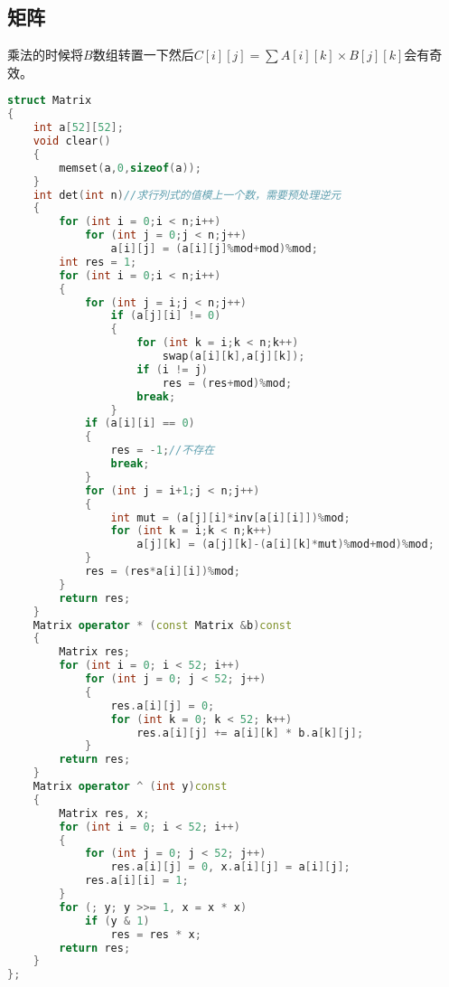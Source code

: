 \subsection{矩阵}
	乘法的时候将$B$数组转置一下然后$C[i][j] = \sum{A[i][k]\times B[j][k]}$会有奇效。
	\begin{lstlisting}[language=c++]
struct Matrix
{
	int a[52][52];
	void clear()
	{
		memset(a,0,sizeof(a));
	}
	int det(int n)//求行列式的值模上一个数，需要预处理逆元
	{
		for (int i = 0;i < n;i++)
			for (int j = 0;j < n;j++)
				a[i][j] = (a[i][j]%mod+mod)%mod;
		int res = 1;
		for (int i = 0;i < n;i++)
		{
			for (int j = i;j < n;j++)
				if (a[j][i] != 0)
				{
					for (int k = i;k < n;k++)
						swap(a[i][k],a[j][k]);
					if (i != j)
						res = (res+mod)%mod;
					break;
				}
			if (a[i][i] == 0)
			{
				res = -1;//不存在
				break;
			}
			for (int j = i+1;j < n;j++)
			{
				int mut = (a[j][i]*inv[a[i][i]])%mod;
				for (int k = i;k < n;k++)
					a[j][k] = (a[j][k]-(a[i][k]*mut)%mod+mod)%mod;
			}
			res = (res*a[i][i])%mod;
		}
		return res;
	}
	Matrix operator * (const Matrix &b)const
	{
		Matrix res;
		for (int i = 0; i < 52; i++)
			for (int j = 0; j < 52; j++)
			{
				res.a[i][j] = 0;
				for (int k = 0; k < 52; k++)
					res.a[i][j] += a[i][k] * b.a[k][j];
			}
		return res;
	}
	Matrix operator ^ (int y)const
	{
		Matrix res, x;
		for (int i = 0; i < 52; i++)
		{
			for (int j = 0; j < 52; j++)
				res.a[i][j] = 0, x.a[i][j] = a[i][j];
			res.a[i][i] = 1;
		}
		for (; y; y >>= 1, x = x * x)
			if (y & 1)
				res = res * x;
		return res;
	}
};
	\end{lstlisting}
